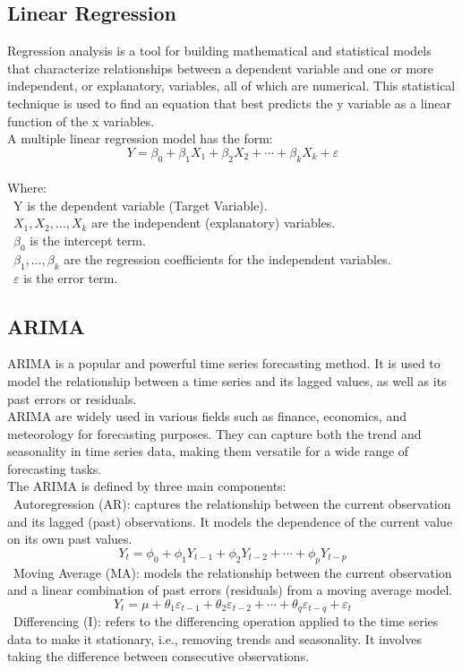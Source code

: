 \documentclass{ieeeojies}
\begin{document}
\subsection{Linear Regression}
Regression analysis is a tool for building mathematical and statistical models that characterize relationships between a dependent variable and one or more independent, or explanatory, variables, all of which are numerical. This statistical technique is used to find an equation that best predicts the y variable as a linear function of the x variables.\\
A multiple linear regression model has the form: 
\[Y=\beta_0+\beta_1X_1+\beta_2X_2+\cdots+\beta_kX_k+\varepsilon\]
\\
Where:\\
	\indent\ Y is the dependent variable (Target Variable).\\
	\indent\ \(X_1, X_2, \ldots, X_k\) are the independent (explanatory) variables.\\
	\indent\ \(\beta_0\) is the intercept term.\\
	\indent\ \(\beta_1,..., \beta_k\) are the regression coefficients for the independent variables.\\
	\indent\ \(\varepsilon\) is the error term.

\subsection{ARIMA}
ARIMA \cite{b4} is a popular and powerful time series forecasting method. It is used to model the relationship between a time series and its lagged values, as well as its past errors or residuals.\\
ARIMA are widely used in various fields such as finance, economics, and meteorology for forecasting purposes. They can capture both the trend and seasonality in time series data, making them versatile for a wide range of forecasting tasks.\\

The ARIMA is defined by three main components:\\
	\indent\textbullet\ Autoregression (AR): captures the relationship between the current observation and its lagged (past) observations. It models the dependence of the current value on its own past values.
	\[ Y_t = \phi_0 + \phi_1 Y_{t-1} + \phi_2 Y_{t-2} + \cdots + \phi_p Y_{t-p} \]
	\indent\textbullet\ Moving Average (MA): models the relationship between the current observation and a linear combination of past errors (residuals) from a moving average model.
	\[ Y_t = \mu + \theta_1 \varepsilon_{t-1} + \theta_2 \varepsilon_{t-2} + \cdots + \theta_q \varepsilon_{t-q} + \varepsilon_t \]
	\indent\textbullet\ Differencing (I): refers to the differencing operation applied to the time series data to make it stationary, i.e., removing trends and seasonality. It involves taking the difference between consecutive observations.\\
 
\end{document}
